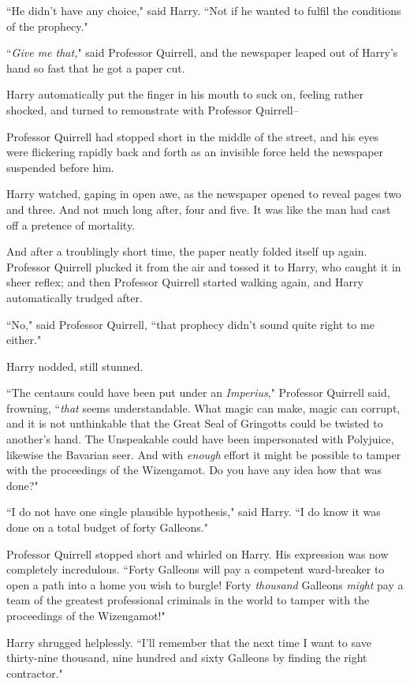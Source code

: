 ``He didn't have any choice," said Harry. ``Not if he wanted to fulfil the conditions of the prophecy."

``\emph{Give me that,}" said Professor Quirrell, and the newspaper leaped out of Harry's hand so fast that he got a paper cut.

Harry automatically put the finger in his mouth to suck on, feeling rather shocked, and turned to remonstrate with Professor Quirrell\---

Professor Quirrell had stopped short in the middle of the street, and his eyes were flickering rapidly back and forth as an invisible force held the newspaper suspended before him.

Harry watched, gaping in open awe, as the newspaper opened to reveal pages two and three. And not much long after, four and five. It was like the man had cast off a pretence of mortality.

And after a troublingly short time, the paper neatly folded itself up again. Professor Quirrell plucked it from the air and tossed it to Harry, who caught it in sheer reflex; and then Professor Quirrell started walking again, and Harry automatically trudged after.

``No," said Professor Quirrell, ``that prophecy didn't sound quite right to me either."

Harry nodded, still stunned.

``The centaurs could have been put under an \emph{Imperius}," Professor Quirrell said, frowning, ``\emph{that} seems understandable. What magic can make, magic can corrupt, and it is not unthinkable that the Great Seal of Gringotts could be twisted to another's hand. The Unspeakable could have been impersonated with Polyjuice, likewise the Bavarian seer. And with \emph{enough} effort it might be possible to tamper with the proceedings of the Wizengamot. Do you have any idea how that was done?"

``I do not have one single plausible hypothesis," said Harry. ``I do know it was done on a total budget of forty Galleons."

Professor Quirrell stopped short and whirled on Harry. His expression was now completely incredulous. ``Forty Galleons will pay a competent ward-breaker to open a path into a home you wish to burgle! Forty \emph{thousand} Galleons \emph{might} pay a team of the greatest professional criminals in the world to tamper with the proceedings of the Wizengamot!"

Harry shrugged helplessly. ``I'll remember that the next time I want to save thirty-nine thousand, nine hundred and sixty Galleons by finding the right contractor."

